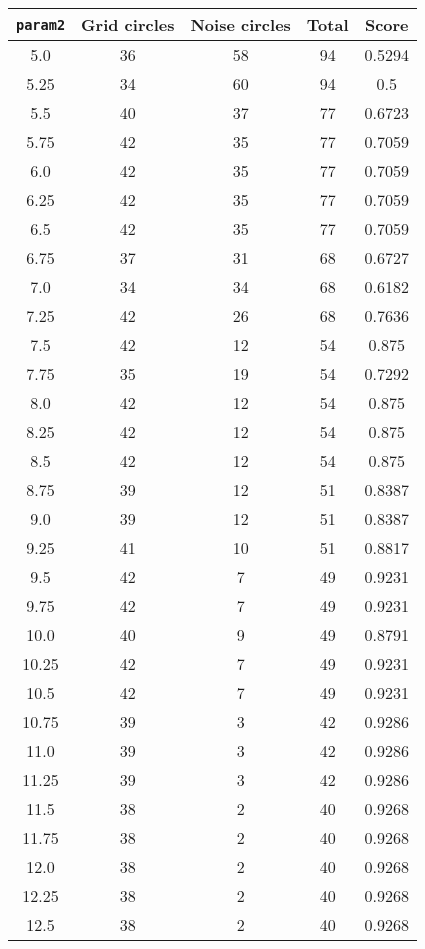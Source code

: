 \documentclass[letterpaper, 12pt]{article}
\begin{document}
\begin{longtable}{|c|c|c|c|c|}
\hline
\textbf{\texttt{param2}} & \textbf{Grid circles} & \textbf{Noise circles} & \textbf{Total} & \textbf{Score} \\
\hline
5.0 & 36 & 58 & 94 & 0.5294 \\
\hline
5.25 & 34 & 60 & 94 & 0.5 \\
\hline
5.5 & 40 & 37 & 77 & 0.6723 \\
\hline
5.75 & 42 & 35 & 77 & 0.7059 \\
\hline
6.0 & 42 & 35 & 77 & 0.7059 \\
\hline
6.25 & 42 & 35 & 77 & 0.7059 \\
\hline
6.5 & 42 & 35 & 77 & 0.7059 \\
\hline
6.75 & 37 & 31 & 68 & 0.6727 \\
\hline
7.0 & 34 & 34 & 68 & 0.6182 \\
\hline
7.25 & 42 & 26 & 68 & 0.7636 \\
\hline
7.5 & 42 & 12 & 54 & 0.875 \\
\hline
7.75 & 35 & 19 & 54 & 0.7292 \\
\hline
8.0 & 42 & 12 & 54 & 0.875 \\
\hline
8.25 & 42 & 12 & 54 & 0.875 \\
\hline
8.5 & 42 & 12 & 54 & 0.875 \\
\hline
8.75 & 39 & 12 & 51 & 0.8387 \\
\hline
9.0 & 39 & 12 & 51 & 0.8387 \\
\hline
9.25 & 41 & 10 & 51 & 0.8817 \\
\hline
9.5 & 42 & 7 & 49 & 0.9231 \\
\hline
9.75 & 42 & 7 & 49 & 0.9231 \\
\hline
10.0 & 40 & 9 & 49 & 0.8791 \\
\hline
10.25 & 42 & 7 & 49 & 0.9231 \\
\hline
10.5 & 42 & 7 & 49 & 0.9231 \\
\hline
10.75 & 39 & 3 & 42 & 0.9286 \\
\hline
11.0 & 39 & 3 & 42 & 0.9286 \\
\hline
11.25 & 39 & 3 & 42 & 0.9286 \\
\hline
11.5 & 38 & 2 & 40 & 0.9268 \\
\hline
11.75 & 38 & 2 & 40 & 0.9268 \\
\hline
12.0 & 38 & 2 & 40 & 0.9268 \\
\hline
12.25 & 38 & 2 & 40 & 0.9268 \\
\hline
12.5 & 38 & 2 & 40 & 0.9268 \\

\end{longtable}
\end{document}
